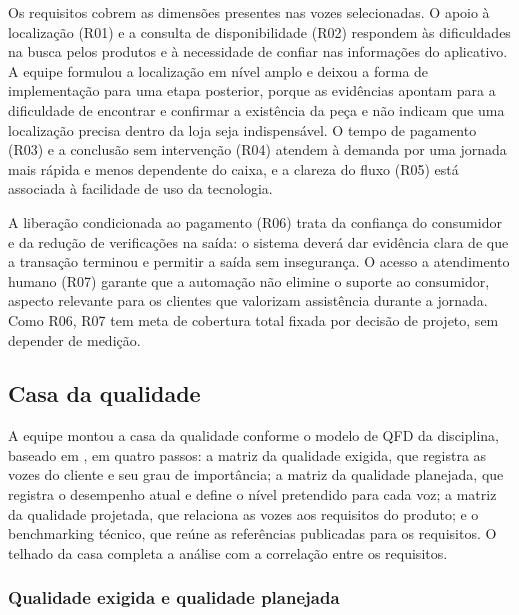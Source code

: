 Os requisitos cobrem as dimensões presentes nas vozes selecionadas. O apoio à localização (R01) e a consulta de disponibilidade (R02) respondem às dificuldades na busca pelos produtos e à necessidade de confiar nas informações do aplicativo. A equipe formulou a localização em nível amplo e deixou a forma de implementação para uma etapa posterior, porque as evidências apontam para a dificuldade de encontrar e confirmar a existência da peça e não indicam que uma localização precisa dentro da loja seja indispensável. O tempo de pagamento (R03) e a conclusão sem intervenção (R04) atendem à demanda por uma jornada mais rápida e menos dependente do caixa, e a clareza do fluxo (R05) está associada à facilidade de uso da tecnologia.

A liberação condicionada ao pagamento (R06) trata da confiança do consumidor e da redução de verificações na saída: o sistema deverá dar evidência clara de que a transação terminou e permitir a saída sem insegurança. O acesso a atendimento humano (R07) garante que a automação não elimine o suporte ao consumidor, aspecto relevante para os clientes que valorizam assistência durante a jornada. Como R06, R07 tem meta de cobertura total fixada por decisão de projeto, sem depender de medição.

\subsection{Casa da qualidade}
\label{subsec:QFD}

A equipe montou a casa da qualidade conforme o modelo de QFD da disciplina, baseado em , em quatro passos: a matriz da qualidade exigida, que registra as vozes do cliente e seu grau de importância; a matriz da qualidade planejada, que registra o desempenho atual e define o nível pretendido para cada voz; a matriz da qualidade projetada, que relaciona as vozes aos requisitos do produto; e o benchmarking técnico, que reúne as referências publicadas para os requisitos. O telhado da casa completa a análise com a correlação entre os requisitos.

\subsubsection{Qualidade exigida e qualidade planejada}
\label{subsubsec:qualidade_planejada}

